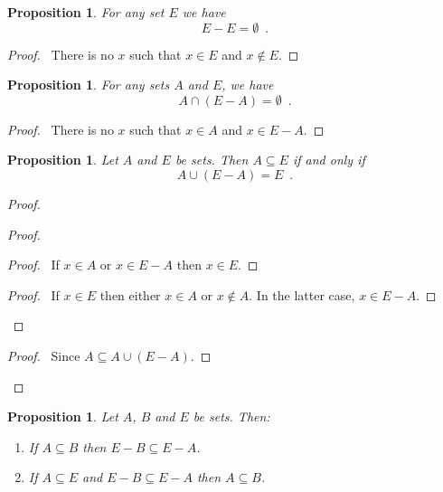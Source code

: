 \documentclass{report}
\let\qed\relax
\newtheorem{prop}[ax]{Proposition}
\theoremstyle{definition}
\begin{document}
\begin{prop}
For any set $E$ we have
\[ E - E = \emptyset \enspace . \]
\end{prop}

\begin{proof}
\pf\ There is no $x$ such that $x \in E$ and $x \notin E$. \qed
\end{proof}

\begin{prop}
For any sets $A$ and $E$, we have
\[ A \cap (E - A) = \emptyset \enspace . \]
\end{prop}

\begin{proof}
\pf\ There is no $x$ such that $x \in A$ and $x \in E - A$. \qed
\end{proof}

\begin{prop}
Let $A$ and $E$ be sets. Then $A \subseteq E$ if and only if
\[ A \cup (E - A) = E \enspace . \]
\end{prop}

\begin{proof}
\pf
{}
\begin{proof}
	\begin{proof}
		\pf\ If $x \in A$ or $x \in E - A$ then $x \in E$.
	\end{proof}
	\begin{proof}
		\pf\ If $x \in E$ then either $x \in A$ or $x \notin A$. In the latter case, $x \in E - A$.
	\end{proof}
\end{proof}
\begin{proof}
	\pf\ Since $A \subseteq A \cup (E - A)$.
\end{proof}
\qed
\end{proof}

\begin{prop}
Let $A$, $B$ and $E$ be sets. Then:
\begin{enumerate}
\item If $A \subseteq B$ then $E - B \subseteq E - A$.
\item If $A \subseteq E$ and $E - B \subseteq E - A$ then $A \subseteq B$.
\end{enumerate}
\end{prop}
\end{document}
